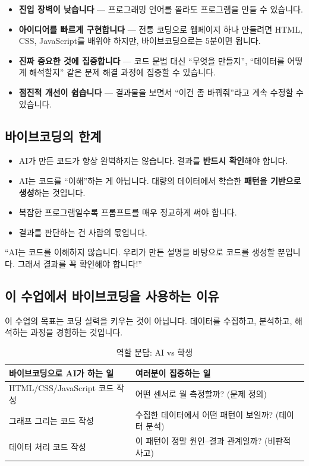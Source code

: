 \documentclass[11pt, a4paper]{article}
\begin{document}
\begin{itemize}[leftmargin=1.5em]
\item \textbf{진입 장벽이 낮습니다} — 프로그래밍 언어를 몰라도 프로그램을 만들 수 있습니다.
\item \textbf{아이디어를 빠르게 구현합니다} — 전통 코딩으로 웹페이지 하나 만들려면 HTML, CSS, JavaScript를 배워야 하지만, 바이브코딩으로는 5분이면 됩니다.
\item \textbf{진짜 중요한 것에 집중합니다} — 코드 문법 대신 ``무엇을 만들지'', ``데이터를 어떻게 해석할지'' 같은 문제 해결 과정에 집중할 수 있습니다.
\item \textbf{점진적 개선이 쉽습니다} — 결과물을 보면서 ``이건 좀 바꿔줘''라고 계속 수정할 수 있습니다.
\end{itemize}

\subsection{바이브코딩의 한계}

\begin{warnbox}[바이브코딩의 한계]
\begin{itemize}[leftmargin=1.5em]
\item AI가 만든 코드가 항상 완벽하지는 않습니다. 결과를 \textbf{반드시 확인}해야 합니다.
\item AI는 코드를 ``이해''하는 게 아닙니다. 대량의 데이터에서 학습한 \textbf{패턴을 기반으로 생성}하는 것입니다.
\item 복잡한 프로그램일수록 프롬프트를 매우 정교하게 써야 합니다.
\item 결과를 판단하는 건 사람의 몫입니다.
\end{itemize}
\end{warnbox}

\begin{corebox}[핵심 메시지]
``AI는 코드를 이해하지 않습니다. 우리가 만든 설명을 바탕으로 코드를 생성할 뿐입니다. 그래서 결과를 꼭 확인해야 합니다!''
\end{corebox}

\subsection{이 수업에서 바이브코딩을 사용하는 이유}

이 수업의 목표는 코딩 실력을 키우는 것이 아닙니다. 데이터를 수집하고, 분석하고, 해석하는 과정을 경험하는 것입니다.

\begin{table}[H]\centering
\caption{역할 분담: AI vs 학생}
\begin{tabular}{p{5.5cm}p{7cm}}\toprule
\textbf{바이브코딩으로 AI가 하는 일} & \textbf{여러분이 집중하는 일} \\\midrule
HTML/CSS/JavaScript 코드 작성 & 어떤 센서로 뭘 측정할까? (문제 정의) \\
그래프 그리는 코드 작성 & 수집한 데이터에서 어떤 패턴이 보일까? (데이터 분석) \\
데이터 처리 코드 작성 & 이 패턴이 정말 원인--결과 관계일까? (비판적 사고) \\
\bottomrule
\end{tabular}
\end{table}
\end{document}
